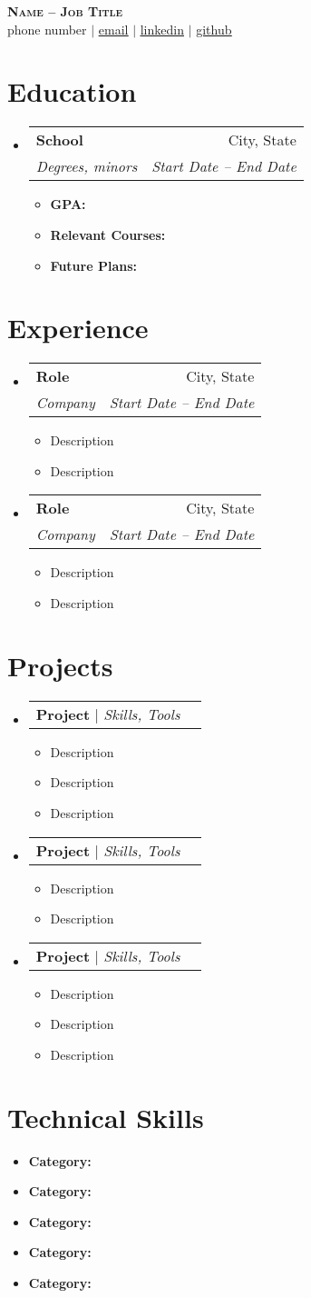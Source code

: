 \documentclass[letterpaper,11pt]{article}
\makeatletter
\newcommand{\resumeItem}[1]{
  \item\small{
    {#1 \vspace{-2pt}}
  }
}
\newcommand{\resumeSubheading}[4]{
  \vspace{-2pt}\item
    \begin{tabular*}{0.97\textwidth}[t]{l@{\extracolsep{\fill}}r}
      \textbf{#1} & #2 \\
      \textit{\small#3} & \textit{\small #4} \\
    \end{tabular*}\vspace{-7pt}
}
\newcommand{\resumeProjectHeading}[2]{
    \item
    \begin{tabular*}{0.97\textwidth}{l@{\extracolsep{\fill}}r}
      \small#1 & #2 \\
    \end{tabular*}\vspace{-7pt}
}
\newcommand{\resumeSubHeadingListStart}{\begin{itemize}[leftmargin=0.15in, label={}]}
\newcommand{\resumeSubHeadingListEnd}{\end{itemize}}
\newcommand{\resumeItemListStart}{\begin{itemize}[leftmargin=0.15in, label=\textbullet]}
\newcommand{\resumeItemListEnd}{\end{itemize}\vspace{-5pt}}
\makeatother
\begin{document}
\begin{center}
    \textbf{\LARGE \scshape Name -- Job Title} \\ \vspace{1pt}
    \small phone number $|$ \href{email}{\underline{email}} $|$ 
    \href{linkedin}{\underline{linkedin}} $|$
    \href{github}{\underline{github}}
\end{center}

\section{Education}
\resumeSubHeadingListStart
  \resumeSubheading
    {School}{City, State}
    {Degrees, minors}{Start Date -- End Date}
    \resumeItemListStart
      \resumeItem{\textbf{GPA:} }
      \resumeItem{\textbf{Relevant Courses:} }
      \resumeItem{\textbf{Future Plans:} }
    \resumeItemListEnd
\resumeSubHeadingListEnd

\section{Experience}
\resumeSubHeadingListStart
  \resumeSubheading
    {Role}{City, State}
    {Company}{Start Date -- End Date}
    \resumeItemListStart
      \resumeItem{Description}
      \resumeItem{Description}
    \resumeItemListEnd
    
  \resumeSubheading
    {Role}{City, State}
    {Company}{Start Date -- End Date}
    \resumeItemListStart
      \resumeItem{Description}
      \resumeItem{Description}
    \resumeItemListEnd
\resumeSubHeadingListEnd

\section{Projects}
\resumeSubHeadingListStart
    
  \resumeProjectHeading
    {\textbf{Project} $|$ \emph{Skills, Tools}}{}
    \resumeItemListStart
      \resumeItem{Description}
      \resumeItem{Description}
      \resumeItem{Description}
    \resumeItemListEnd
    
  \resumeProjectHeading
    {\textbf{Project} $|$ \emph{Skills, Tools}}{}
    \resumeItemListStart
      \resumeItem{Description}
      \resumeItem{Description}
    \resumeItemListEnd
    
  \resumeProjectHeading
    {\textbf{Project} $|$ \emph{Skills, Tools}}{}
    \resumeItemListStart
      \resumeItem{Description}
      \resumeItem{Description}
      \resumeItem{Description}
    \resumeItemListEnd
    
\resumeSubHeadingListEnd

\section{Technical Skills}
\resumeSubHeadingListStart
    \resumeItemListStart
      \resumeItem{\textbf{Category:} }
      \resumeItem{\textbf{Category:} }
      \resumeItem{\textbf{Category:} }
      \resumeItem{\textbf{Category:} }
      \resumeItem{\textbf{Category:}}
    \resumeItemListEnd
\resumeSubHeadingListEnd
\end{document}
